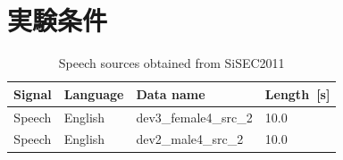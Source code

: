 \section{実験条件}
\label{sec:ex_condition}

\begin{table}[t]
\begin{center}
 \caption{Speech sources obtained from SiSEC2011}
 \label{table:wav}
  \begin{tabular}{clll}\hline \hline
   Signal & Language & Data name &Length~[s]  \\ \hline
   Speech & English & dev3\_female4\_src\_2 & 10.0  \\ \hline
   Speech & English & dev2\_male4\_src\_2 &  10.0 \\ \hline
   \hline
  \end{tabular}
 \end{center}
\end{table}

